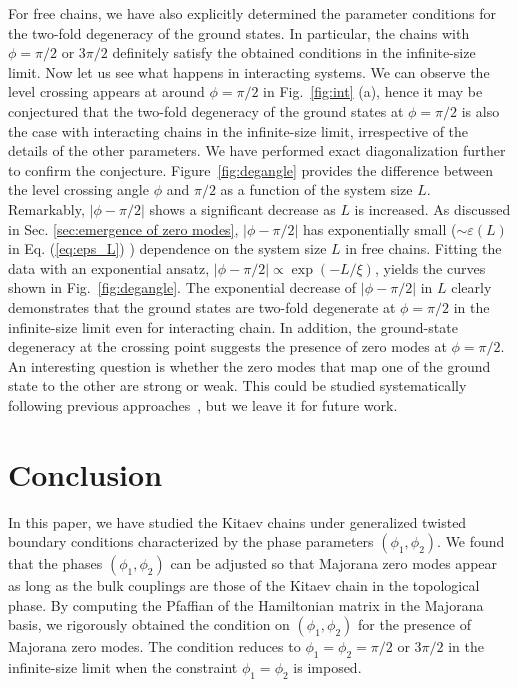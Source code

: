 \documentclass[aps, prb, showpacs, twocolumn, %
amssymb,superscriptaddress]{revtex4}
\begin{document}
For free chains, we have also explicitly determined the parameter conditions for the two-fold degeneracy of the ground states. In particular, the chains with $\phi=\pi/2$ or $3\pi/2$ definitely satisfy the obtained conditions in the infinite-size limit. Now let us see what %
happens in interacting systems. We can observe the level crossing appears at around $\phi=\pi/2$ in Fig.~\ref{fig:int} (a), hence it may be conjectured that the two-fold degeneracy of the ground states at $\phi=\pi/2$ is also the case with interacting chains in the infinite-size limit, irrespective of the details of the other parameters. We have performed exact diagonalization further to confirm the conjecture. Figure~\ref{fig:degangle} provides the difference between the level crossing angle $\phi$ and $\pi/2$ as a function of the system size $L$. Remarkably, $\lvert\phi-\pi/2\rvert$ shows a significant decrease as $L$ is increased. As discussed in Sec. \ref{sec:emergence of zero modes}, $\lvert\phi-\pi/2\rvert$ has exponentially small ($\sim\varepsilon(L)$ in Eq. (\ref{eq:eps_L}) ) dependence on the system size $L$ in free chains. 
Fitting the data with an exponential ansatz, $|\phi-\pi/2| \propto \exp (-L/\xi )$, yields the curves shown in Fig.~\ref{fig:degangle}. 
%
%
The exponential decrease of $\lvert\phi-\pi/2\rvert$ in $L$ clearly demonstrates that the ground states are two-fold degenerate at $\phi=\pi/2$ in the infinite-size limit even for interacting chain. In addition, the ground-state degeneracy at the crossing point suggests the presence of zero modes at $\phi=\pi/2$. An interesting question is whether the zero modes that map one of the ground state to the other are strong or weak. This could be studied systematically following previous approaches~\cite{Stoudenmire-11, Aris-15}, but we leave it for future work. 

\section{Conclusion}
\label{sec:conc}

In this paper, we have studied the Kitaev chains under generalized twisted boundary conditions characterized by the phase parameters $(\phi_1, \phi_2)$. We found that the phases $(\phi_1, \phi_2)$ can be adjusted so that Majorana zero modes appear as long as the bulk couplings are those of the Kitaev chain in the topological phase. By computing the Pfaffian of the Hamiltonian matrix in the Majorana basis, we rigorously obtained the condition on $(\phi_1, \phi_2)$ for the presence of Majorana zero modes. The condition reduces to $\phi_1=\phi_2=\pi/2$ or $3\pi/2$ in the infinite-size limit when the constraint $\phi_1=\phi_2$ is imposed. 
\end{document}
